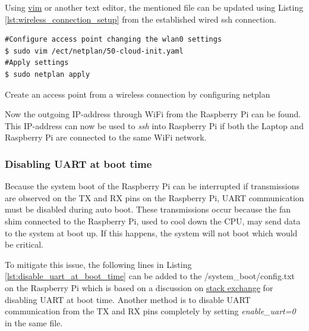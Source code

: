 \documentclass[../Head/report.tex]{subfiles}
\begin{document}
Using \href{https://www.vim.org/}{vim} or another text editor, the mentioned file can be updated using Listing \ref{lst:wireless_connection_setup} from the established wired ssh connection.  

\begin{listing}[H] 
\begin{tcolorbox}[
    enhanced,
    attach boxed title to top left={xshift=6mm,yshift=-3mm},
    colback=lightgreen!20,
    colframe=lightgreen,
    fonttitle=\bfseries\color{black},
]
\begin{verbatim}
#Configure access point changing the wlan0 settings
$ sudo vim /ect/netplan/50-cloud-init.yaml
#Apply settings  
$ sudo netplan apply
\end{verbatim}
\end{tcolorbox}
\caption{Create an access point from a wireless connection by configuring netplan}
\label{lst:wireless_connection_setup}    
\end{listing} 

Now the outgoing IP-address through WiFi from the Raspberry Pi can be found. This IP-address can now be used to \textit{ssh} into Raspberry Pi if both the Laptop and Raspberry Pi are connected to the same WiFi network.

\subsubsection{Disabling UART at boot time}
\label{sec:disabling_uart_at_boot_time_pi}

Because the system boot of the Raspberry Pi can be interrupted if transmissions are observed on the TX and RX pins on the Raspberry Pi, UART communication must be disabled during auto boot. These transmissions occur 
because the fan shim connected to the Raspberry Pi, used to cool down the CPU, may send data to the system at boot up. If this happens, the system will not boot which would be critical. 

To mitigate this issue, the following lines in Listing \ref{lst:disable_uart_at_boot_time} can be added to the /system\_boot/config.txt on the Raspberry Pi which is based on a discussion on \href{https://askubuntu.com/questions/1215848/how-to-disable-ttyama0-console-on-boot-raspberry-pi}{stack exchange} for disabling UART at boot time. Another method is to disable UART communication from the TX and RX pins completely by setting \textit{enable\_uart=0} in the same file. 
\end{document}
